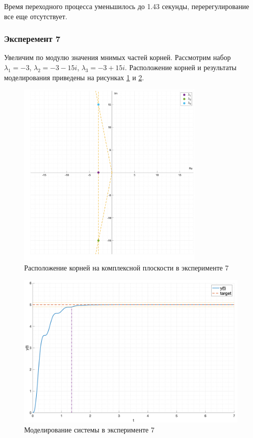 Время переходного процесса уменьшилось до 1.43 секунды, перерегулирование все еще отсутствует.

\subsubsection{Эксперемент 7}
\label{task2_case7}
Увеличим по модулю значения мнимых частей корней. Рассмотрим набор 
$\lambda_1 = -3$, $\lambda_2 = -3 - 15i$, $\lambda_3 = -3 + 15i$.
Расположение корней и результаты моделирования приведены на рисунках
\ref{fig:task_2_points7} и \ref{fig:task_2_case7}.

\begin{figure}
    \centering
    \includegraphics[width=0.8\textwidth]{media/plots/task2_points7.png}
    \caption{Расположение корней на комплексной плоскости в эксперименте 7}
    \label{fig:task_2_points7}
\end{figure}

\begin{figure}
    \centering
    \includegraphics[width=\textwidth]{media/plots/task2_case7.png}
    \caption{Моделирование системы в эксперименте 7}
    \label{fig:task_2_case7}
\end{figure}

